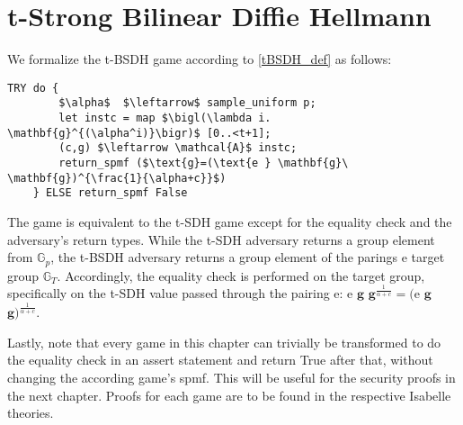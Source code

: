 \section{t-Strong Bilinear Diffie Hellmann}
We formalize the t-BSDH game according to \ref{tBSDH_def} as follows: 
\begin{lstlisting}[language=isabelle]
    TRY do {
        $\alpha$  $\leftarrow$ sample_uniform p;
        let instc = map $\bigl(\lambda i. \mathbf{g}^{(\alpha^i)}\bigr)$ [0..<t+1];
        (c,g) $\leftarrow \mathcal{A}$ instc;
        return_spmf ($\text{g}=(\text{e } \mathbf{g}\ \mathbf{g})^{\frac{1}{\alpha+c}}$)
    } ELSE return_spmf False
\end{lstlisting}
The game is equivalent to the t-SDH game except for the equality check and the adversary's return types. 
While the t-SDH adversary returns a group element from $\mathbb{G}_p$, the t-BSDH adversary returns a group element of the parings e target group $\mathbb{G}_T$. Accordingly, the equality check is performed on the target group, specifically on the t-SDH value passed through the pairing e: e $\mathbf{g}$ $\mathbf{g}^{\frac{1}{\alpha+c}} = \text{(e}$ $\mathbf{g}$ $\mathbf{g})^{\frac{1}{\alpha+c}}$.

Lastly, note that every game in this chapter can trivially be transformed to do the equality check in an assert statement and return True after that, without changing the according game's spmf. This will be useful for the security proofs in the next chapter. Proofs for each game are to be found in the respective Isabelle theories.